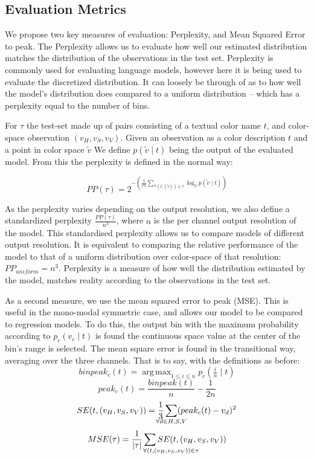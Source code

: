 \documentclass[11pt,letterpaper]{article}
\DeclareMathOperator*{\argmax}{arg\,max}
\begin{document}
\subsection{Evaluation Metrics}
We propose two key measures of evaluation: Perplexity, and Mean Squared Error to peak.
The Perplexity allows us to evaluate how well our estimated distribution matches the distribution of the observations in the test set.
Perplexity is commonly used for evaluating language models, however here it is being used to evaluate the discretized distribution.
It can loosely be through of as to how well the model's distribution does compared to a uniform distribution -- which has a perplexity equal to the number of bins.


For $\tau$ the test-set made up of pairs consisting of a textual color name $t$, and color-space observation $(v_{H}, v_{S}, v_{V})$.
Given an observation as a color description $t$ and a point in color space $\tilde{v}$
We define $p(\tilde{v}\mid t)$ being the output of the evaluated model.
From this the perplexity is defined in the normal way:

\[
 PP(\tau) = 2^{-\left(
 	\displaystyle\frac{1}{|\tau|} 
 	\displaystyle\sum_{
	 		\forall(t,(\tilde{v})) \in \tau}
 	 \log_2 p(\tilde{v}\mid t)\right)}
\]


As the perplexity varies depending on the output resolution,
we also define a standardized perplexity $\frac{PP(\tau)}{n^3}$, where $n$ is the per channel output resolution of the model.
This standardised perplexity allows us to compare models of different output resolution.
It is equivalent to comparing the relative performance of the model to that of a uniform distribution over color-space of that resolution: $PP_{uniform}=n^3$.
Perplexity is a measure of how well the distribution estimated by the model, matches reality according to the observations in the test set.


As a second measure, we use the mean squared error to peak (MSE).
This is useful in the mono-modal symmetric case, and allows our model to be compared to regression models.
To do this, the output bin with the maximum probability according to $p_c(v_c\mid t)$ is found the continuous space value at the center of the bin's range is selected.
The mean square error is found in the transitional way, averaging over the three channels.
That is to say, with the definitions as before:
\[
binpeak_c(t)=\argmax_{1\le i \le n}{p_c\left(\tfrac{i}{n} \mid t\right)}
\]
\[
peak_c(t)=\frac{binpeak(t)}{n} - \frac{1}{2n}
\]
\[
SE(t, (v_{H}, v_{S}, v_{V})) = \frac{1}{3}
	\sum_{\mathclap{\forall d\in{H,S,V}}} (peak_c(t) - v_d)^2
\]
\[
MSE(\tau) =\frac{1}{|\tau|}
	\sum_{\mathclap{\qquad\qquad\quad
		\forall(t,(v_{H}, v_{S}, v_{V})) \in \tau}}
	 SE(t,(v_{H}, v_{S}, v_{V}))
\]
\end{document}
